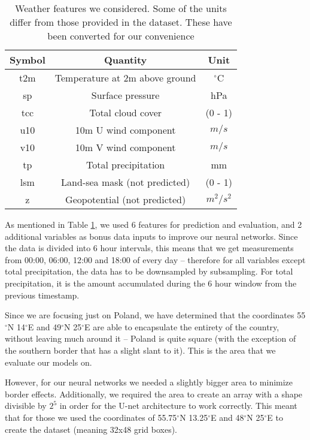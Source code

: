 \begin{table}[!ht]
\centering
\begin{tabular}{|c|c|c|}
     \hline
     Symbol & Quantity & Unit \\
     \hline
     t2m & Temperature at 2m above ground & $^{\circ}$C \\
     sp & Surface pressure & hPa \\
     tcc & Total cloud cover & (0 - 1) \\
     u10 & 10m U wind component & $m/s$ \\
     v10 & 10m V wind component & $m/s$ \\
     tp & Total precipitation & mm \\
     \hline
     lsm & Land-sea mask (not predicted) & (0 - 1) \\
     z & Geopotential (not predicted) & $m^2/s^2$ \\
     \hline
\end{tabular}
\caption{Weather features we considered. Some of the units differ from those provided in the dataset. These have been converted for our convenience}
\label{tab:data_features2}
\end{table}

As mentioned in Table \ref{tab:data_features2}, we used 6 features for prediction and evaluation, and 2 additional variables as bonus data inputs to improve our neural networks. Since the data is divided into 6 hour intervals, this means that we get measurements from 00:00, 06:00, 12:00 and 18:00 of every day -- therefore for all variables except total precipitation, the data has to be downsampled by subsampling. For total precipitation, it is the amount accumulated during the 6 hour window from the previous timestamp.

Since we are focusing just on Poland, we have determined that the coordinates 55$^{\circ}$N 14$^{\circ}$E and 49$^{\circ}$N 25$^{\circ}$E are able to encapsulate the entirety of the country, without leaving much around it -- Poland is quite square (with the exception of the southern border that has a slight slant to it). This is the area that we evaluate our models on.

However, for our neural networks we needed a slightly bigger area to minimize border effects. Additionally, we required the area to create an array with a shape divisible by $2^5$ in order for the U-net architecture to work correctly. This meant that for those we used the coordinates of 55.75$^{\circ}$N 13.25$^{\circ}$E and 48$^{\circ}$N 25$^{\circ}$E to create the dataset (meaning 32x48 grid boxes).


